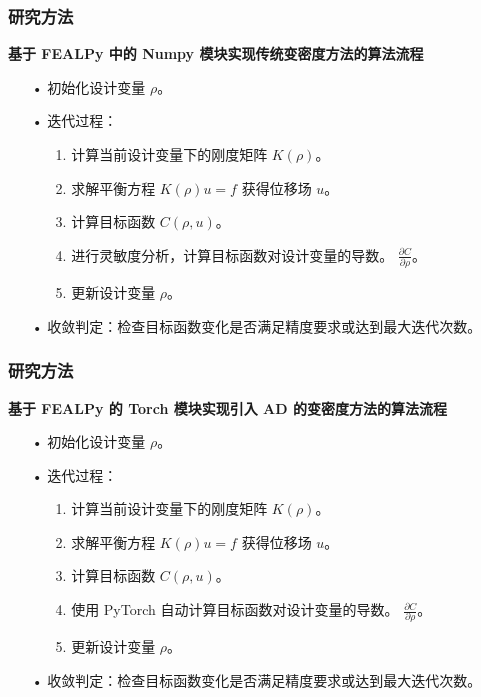 \documentclass{beamer}
\numberwithin{subsection}{section}
\begin{document}
\begin{frame}
	\frametitle{研究方法}
	 \textbf{基于 FEALPy 中的 Numpy 模块实现传统变密度方法的算法流程}
	 \begin{itemize}
            \item[•]初始化设计变量 $\rho$。
            \item[•]迭代过程：
	        \begin{enumerate}
	            \item[1.]计算当前设计变量下的刚度矩阵 $K(\rho)$。
	            \item[2.]求解平衡方程 $K(\rho) u = f$ 获得位移场 $u$。
	            \item[3.]计算目标函数 $C(\rho, u)$。
	            \item[4.]进行灵敏度分析，计算目标函数对设计变量的导数。
	            $\frac{\partial C}{\partial \rho}$。
	            \item[5.]更新设计变量 $\rho$。
	        \end{enumerate}
	        \item[•]收敛判定：检查目标函数变化是否满足精度要求或达到最大迭代次数。
     \end{itemize}
\end{frame}

\begin{frame}
	\frametitle{研究方法}
	 \textbf{基于 FEALPy 的 Torch 模块实现引入 AD 的变密度方法的算法流程}
	 \begin{itemize}
            \item[•]初始化设计变量 $\rho$。
            \item[•]迭代过程：
	        \begin{enumerate}
	            \item[1.]计算当前设计变量下的刚度矩阵 $K(\rho)$。
	            \item[2.]求解平衡方程 $K(\rho) u = f$ 获得位移场 $u$。
	            \item[3.]计算目标函数 $C(\rho, u)$。
	            \item[4.]使用 PyTorch 自动计算目标函数对设计变量的导数。 
	            $\frac{\partial C}{\partial \rho}$。
	            \item[5.]更新设计变量 $\rho$。
	        \end{enumerate}
	        \item[•]收敛判定：检查目标函数变化是否满足精度要求或达到最大迭代次数。
     \end{itemize}
\end{frame}
\end{document}
